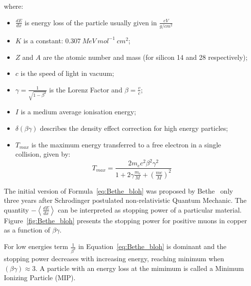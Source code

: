 where: 
\begin{itemize}
    \item $\frac{dE}{dx}$ is energy loss of the particle usually given in $\frac{eV}{g/cm^{2}}$
    \item $K$ is a constant: $0.307~ MeV~ mol^{-1}~ cm^2$;
    \item $Z$ and $A$ are the atomic number and mass (for silicon 14 and 28 respectively);
    \item $c$ is the speed of light in vacuum;
    \item $\gamma = \frac{1}{\sqrt{1-\beta^2}}$ is the Lorenz Factor and $\beta = \frac{v}{c}$;
    \item $I$ is a medium average ionisation energy;
    \item $\delta(\beta \gamma)$ describes the density effect correction for high energy particles; 
    \item $T_{max}$ is the maximum energy transferred to a free electron in a single collision, given by:
    \begin{equation}
        T_{max} = \frac{2m_e c^2 \beta^2 \gamma^2}{1+2\gamma \frac{m_e}{M}+ (\frac{me}{M})^2}
    \end{equation}
\end{itemize}

The initial version of Formula~\ref{eq:Bethe_bloh} was proposed by Bethe~\cite{Bethe} only three years after Schrodinger postulated non-relativistic Quantum Mechanic. The quantity $-\left< \frac{dE}{dx} \right>$ can be interpreted as stopping power of a particular material. Figure~\ref{fig:Bethe_bloh} presents the stopping power for positive muons in copper as a function of $\beta \gamma$. 

For low energies term $\frac{1}{\beta^2}$ in Equation~\ref{eq:Bethe_bloh} is dominant and the stopping power decreases with increasing energy, reaching minimum when $(\beta \gamma) \approx 3 $. A particle with an energy loss at the mimimum is called a Minimum Ionizing Particle (MIP). 



